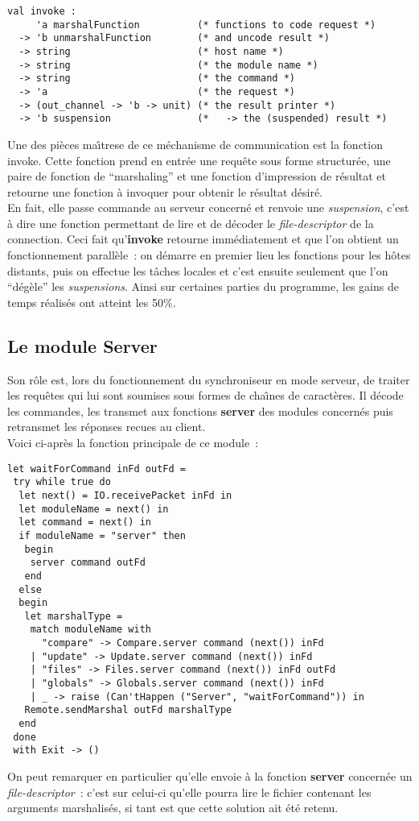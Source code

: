 \documentclass[11pt]{report}
\newcommand{\data}[1]{\emph{#1}}
\newcommand{\func}[1]{\textbf{#1}}
\begin{document}
{\begin{verbatim}
val invoke :
     'a marshalFunction          (* functions to code request *)
  -> 'b unmarshalFunction        (* and uncode result *)
  -> string                      (* host name *)
  -> string                      (* the module name *)
  -> string                      (* the command *)
  -> 'a                          (* the request *)
  -> (out_channel -> 'b -> unit) (* the result printer *)
  -> 'b suspension               (*   -> the (suspended) result *)
\end{verbatim}
Une des pi\`eces ma\^{\i}trese de ce m\'echanisme de communication est la 
fonction invoke.
Cette fonction prend en entr\'ee une requ\^ete sous forme structur\'ee, une paire de 
fonction de ``marshaling'' et une fonction d'impression de r\'esultat et
retourne une fonction \`a invoquer pour obtenir le r\'esultat d\'esir\'e.\\
En fait, elle passe commande au serveur concern\'e et renvoie une \data{suspension}, 
c'est \`a dire une fonction permettant de lire et de d\'ecoder le 
\data{file-descriptor} de la connection.
Ceci fait qu'\func{invoke} retourne imm\'ediatement et que l'on obtient 
un fonctionnement parall\`ele~: on d\'emarre en premier lieu les fonctions pour
les h\^otes distants, puis on effectue les t\^aches locales
et c'est ensuite seulement que l'on ``d\'eg\`ele'' les \data{suspensions}.
Ainsi sur certaines parties du programme, les gains de temps r\'ealis\'es ont
atteint les 50\%.
\subsection{Le module Server}
Son r\^ole est, lors du fonctionnement du synchroniseur en mode serveur, de
traiter les requ\^etes qui lui sont soumises sous formes de cha\^{\i}nes de
caract\`eres. Il d\'ecode les commandes, les transmet aux fonctions \func{server}
des modules concern\'es puis retransmet les r\'eponses recues au client.\\
Voici ci-apr\`es la fonction principale de ce module~:
\begin{verbatim}
let waitForCommand inFd outFd =
 try while true do
  let next() = IO.receivePacket inFd in
  let moduleName = next() in
  let command = next() in
  if moduleName = "server" then 
   begin
    server command outFd
   end
  else 
  begin
   let marshalType =
    match moduleName with
      "compare" -> Compare.server command (next()) inFd
    | "update" -> Update.server command (next()) inFd
    | "files" -> Files.server command (next()) inFd outFd
    | "globals" -> Globals.server command (next()) inFd
    | _ -> raise (Can'tHappen ("Server", "waitForCommand")) in
   Remote.sendMarshal outFd marshalType
  end
 done
 with Exit -> ()
\end{verbatim}
On peut remarquer en particulier qu'elle envoie \`a la fonction \func{server}
concern\'ee un \data{file-descriptor}~: c'est sur celui-ci qu'elle pourra lire
le fichier contenant les arguments marshalis\'es, si tant est que cette
solution ait \'et\'e retenu.
}
\end{document}
